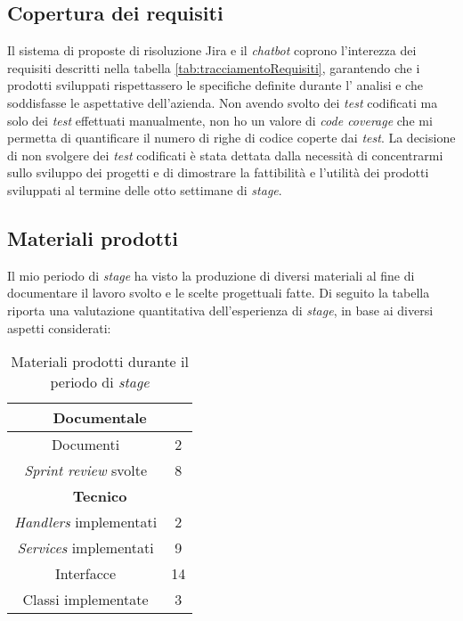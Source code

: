 \subsection{Copertura dei requisiti}
Il sistema di proposte di risoluzione Jira e il \textit{chatbot} coprono l'interezza dei requisiti descritti nella tabella \ref{tab:tracciamentoRequisiti}, garantendo che i prodotti sviluppati rispettassero le specifiche definite durante l' analisi e che soddisfasse le aspettative dell'azienda. Non avendo svolto dei \textit{test} codificati ma solo dei \textit{test} effettuati manualmente, non ho un valore di \textit{code coverage} che mi permetta di quantificare il numero di righe di codice coperte dai \textit{test}. La decisione di non svolgere dei \textit{test} codificati è stata dettata dalla necessità di concentrarmi sullo sviluppo dei progetti e di dimostrare la fattibilità e l'utilità dei prodotti sviluppati al termine delle otto settimane di \textit{stage}.

\subsection{Materiali prodotti}
Il mio periodo di \textit{stage} ha visto la produzione di diversi materiali al fine di documentare il lavoro svolto e le scelte progettuali fatte.
Di seguito la tabella riporta una valutazione quantitativa dell'esperienza di \textit{stage}, in base ai diversi aspetti considerati:
\begin{table}[H]
    \centering
    \begin{tabular}{|c|c|}
        \hline
        \multicolumn{2}{|c|}{\textbf{Documentale}} \\
        \hline
        Documenti & 2 \\
        \hline
        \textit{Sprint review} svolte & 8 \\
        \hline
        \multicolumn{2}{|c|}{\textbf{Tecnico}} \\
        \hline
        \textit{Handlers} implementati & 2 \\
        \hline
        \textit{Services} implementati & 9 \\
        \hline
        Interfacce & 14 \\
        \hline
        Classi implementate & 3 \\
        \hline
    \end{tabular}
    \caption{Materiali prodotti durante il periodo di \textit{stage}}
    \label{tab:quantitaMateriali}
\end{table}

